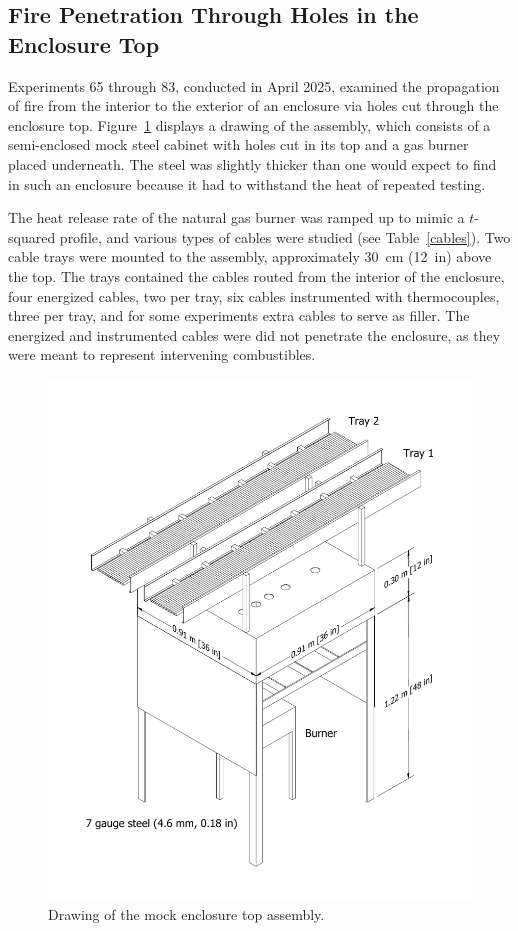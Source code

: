 \clearpage


\subsection{Fire Penetration Through Holes in the Enclosure Top}

Experiments 65 through 83, conducted in April 2025, examined the propagation of fire from the interior to the exterior of an enclosure via holes cut through the enclosure top. Figure~\ref{mock_cabinet_with_trays} displays a drawing of the assembly, which consists of a semi-enclosed mock steel cabinet with holes cut in its top and a gas burner placed underneath. The steel was slightly thicker than one would expect to find in such an enclosure because it had to withstand the heat of repeated testing.

The heat release rate of the natural gas burner was ramped up to mimic a $t$-squared profile, and various types of cables were studied (see Table~\ref{cables}). Two cable trays were mounted to the assembly, approximately 30~cm (12~in) above the top. The trays contained the cables routed from the interior of the enclosure, four energized cables, two per tray, six cables instrumented with thermocouples, three per tray, and for some experiments extra cables to serve as filler. The energized and instrumented cables were did not penetrate the enclosure, as they were meant to represent intervening combustibles.

\begin{figure}[p]
\includegraphics[width=\textwidth]{../FIGURES/Cabinet_Top_Assembly_with_Trays}
\caption[Drawing of mock enclosure top]{Drawing of the mock enclosure top assembly.}
\label{mock_cabinet_with_trays}
\end{figure}


